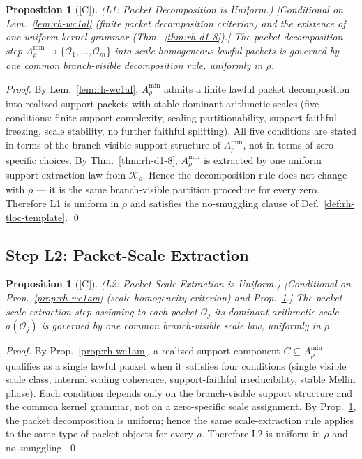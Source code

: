\documentclass[12pt,oneside]{amsbook}
\theoremstyle{plain}
\newtheorem{proposition}[theorem]{Proposition}
\theoremstyle{definition}
\theoremstyle{remark}
\newcommand{\status}[1]{\textup{[#1]}}
\begin{document}
\begin{proposition}[\status{C}]\label{prop:rh-tloc-L1}
\textup{(L1: Packet Decomposition is Uniform.)}
\textup{[Conditional on Lem.~\ref{lem:rh-wc1al} (finite packet
decomposition criterion) and the existence of one uniform kernel
grammar (Thm.~\ref{thm:rh-d1-8}).]}
The packet decomposition step $A_\rho^{\min} \to \{\mathcal{O}_1,
\ldots, \mathcal{O}_m\}$ into scale-homogeneous lawful packets is
governed by one common branch-visible decomposition rule, uniformly
in $\rho$.
\end{proposition}

\begin{proof}
By Lem.~\ref{lem:rh-wc1al}, $A_\rho^{\min}$ admits a finite lawful
packet decomposition into realized-support packets with stable
dominant arithmetic scales (five conditions: finite support
complexity, scaling partitionability, support-faithful freezing,
scale stability, no further faithful splitting). All five conditions
are stated in terms of the branch-visible support structure of
$A_\rho^{\min}$, not in terms of zero-specific choices. By
Thm.~\ref{thm:rh-d1-8}, $A_\rho^{\min}$ is extracted by one uniform
support-extraction law from $\mathcal{K}_\rho$. Hence the
decomposition rule does not change with $\rho$ --- it is the same
branch-visible partition procedure for every zero. Therefore L1 is
uniform in $\rho$ and satisfies the no-smuggling clause of
Def.~\ref{def:rh-tloc-template}. \qed
\end{proof}

\subsection{Step L2: Packet-Scale Extraction}

\begin{proposition}[\status{C}]\label{prop:rh-tloc-L2}
\textup{(L2: Packet-Scale Extraction is Uniform.)}
\textup{[Conditional on Prop.~\ref{prop:rh-wc1am} (scale-homogeneity
criterion) and Prop.~\ref{prop:rh-tloc-L1}.]}
The packet-scale extraction step assigning to each packet
$\mathcal{O}_j$ its dominant arithmetic scale $a(\mathcal{O}_j)$
is governed by one common branch-visible scale law, uniformly in
$\rho$.
\end{proposition}

\begin{proof}
By Prop.~\ref{prop:rh-wc1am}, a realized-support component
$C \subseteq A_\rho^{\min}$ qualifies as a single lawful packet when
it satisfies four conditions (single visible scale class, internal
scaling coherence, support-faithful irreducibility, stable Mellin
phase). Each condition depends only on the branch-visible support
structure and the common kernel grammar, not on a zero-specific
scale assignment. By Prop.~\ref{prop:rh-tloc-L1}, the packet
decomposition is uniform; hence the same scale-extraction rule
applies to the same type of packet objects for every $\rho$.
Therefore L2 is uniform in $\rho$ and no-smuggling. \qed
\end{proof}
\end{document}
